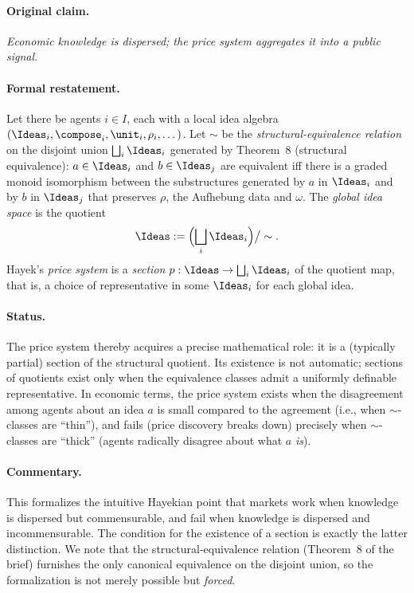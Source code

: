 \paragraph{Original claim.} \emph{Economic knowledge is dispersed; the
price system aggregates it into a public signal.}

\paragraph{Formal restatement.} Let there be agents $i\in I$, each with
a local idea algebra $(\Ideas_i,\compose_i,\unit_i,\rho_i,\dots)$. Let
$\sim$ be the \emph{structural-equivalence relation} on the disjoint
union $\bigsqcup_i \Ideas_i$ generated by Theorem~8 (structural
equivalence): $a\in\Ideas_i$ and $b\in\Ideas_j$ are equivalent iff there
is a graded monoid isomorphism between the substructures generated by
$a$ in $\Ideas_i$ and by $b$ in $\Ideas_j$ that preserves $\rho$, the
Aufhebung data and $\omega$. The \emph{global idea space} is the
quotient
\[
  \Ideas := \Bigl(\bigsqcup_i \Ideas_i\Bigr)\big/\sim.
\]
Hayek's \emph{price system} is a \emph{section} $p:\Ideas \to
\bigsqcup_i \Ideas_i$ of the quotient map, that is, a choice of
representative in some $\Ideas_i$ for each global idea.

\paragraph{Status.} The price system thereby acquires a precise
mathematical role: it is a (typically partial) section of the structural
quotient. Its existence is not automatic; sections of quotients exist
only when the equivalence classes admit a uniformly definable
representative. In economic terms, the price system exists when the
disagreement among agents about an idea $a$ is small compared to the
agreement (i.e., when $\sim$-classes are ``thin''), and fails (price
discovery breaks down) precisely when $\sim$-classes are ``thick''
(agents radically disagree about what $a$ \emph{is}).

\paragraph{Commentary.} This formalizes the intuitive Hayekian point
that markets work when knowledge is dispersed but commensurable, and
fail when knowledge is dispersed and incommensurable. The condition for
the existence of a section is exactly the latter distinction. We note
that the structural-equivalence relation (Theorem~8 of the brief)
furnishes the only canonical equivalence on the disjoint union, so the
formalization is not merely possible but \emph{forced}.

